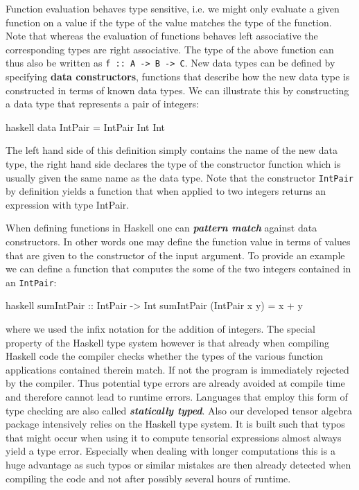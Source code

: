 \documentclass[a4paper,12pt, DIV=14, BCOR=5mm, twoside, headsepline, numbers=noenddot]{scrbook}
\begin{document}
Function evaluation behaves type sensitive, i.e. we might only evaluate a given function on a value if the type of the value matches the type of the function.
Note that whereas the evaluation of functions behaves left associative the corresponding types are right associative. The type of the above function can thus also be written as \texttt{f :: A -> B -> C}.
New data types can be defined by specifying \textbf{\textbf{data constructors}}, functions that describe how the new data type is constructed in terms of known data types. We can illustrate this by constructing a data type that represents a pair of integers:
\begin{center}
\begin{cminted}{haskell}
data IntPair = IntPair Int Int 
\end{cminted}
\end{center}
The left hand side of this definition simply contains the name of the new data type, the right hand side declares the type of the constructor function which is usually given the same name as the data type. 
Note that the constructor \texttt{IntPair} by definition yields a function that when applied to two integers returns an expression with type IntPair. 

When defining functions in Haskell one can \textbf{\textit{pattern match}} against data constructors. In other words one may define the function value in terms of values that are given to the constructor of the input argument. To provide an example we can define a function that computes the some of the two integers contained in an \texttt{IntPair}:
\begin{center}
\begin{cminted}{haskell}
sumIntPair :: IntPair -> Int 
sumIntPair (IntPair x y) = x + y
\end{cminted}
\end{center}
where we used the infix notation for the addition of integers. 
The special property of the Haskell type system however is that already when compiling Haskell code the compiler checks whether the types of the various function applications contained therein match. If not the program is immediately rejected by the compiler. Thus potential type errors are already avoided at compile time and therefore cannot lead to runtime errors. Languages that employ this form of type checking are also called \textit{\textbf{statically typed}}. Also our developed tensor algebra package intensively relies on the Haskell type system. It is built such that typos that might occur when using it to compute tensorial expressions almost always yield a type error. Especially when dealing with longer computations this is a huge advantage as such typos or similar mistakes are then already detected when compiling the code and not after possibly several hours of runtime.  
\end{document}
